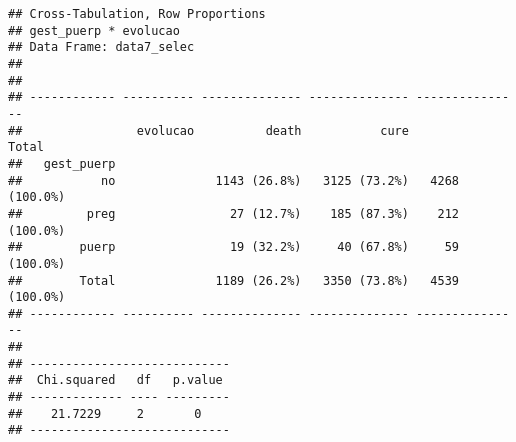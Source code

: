 \documentclass[
]{article}
\newenvironment{Shaded}{\begin{snugshade}}{\end{snugshade}}
\newcommand{\DataTypeTok}[1]{\textcolor[rgb]{0.13,0.29,0.53}{#1}}
\newcommand{\KeywordTok}[1]{\textcolor[rgb]{0.13,0.29,0.53}{\textbf{#1}}}
\newcommand{\NormalTok}[1]{#1}
\newcommand{\OperatorTok}[1]{\textcolor[rgb]{0.81,0.36,0.00}{\textbf{#1}}}
\newcommand{\OtherTok}[1]{\textcolor[rgb]{0.56,0.35,0.01}{#1}}
\newcommand{\StringTok}[1]{\textcolor[rgb]{0.31,0.60,0.02}{#1}}
\begin{document}
\begin{Shaded}
\end{Shaded}

\begin{Shaded}
\end{Shaded}

\begin{verbatim}
## Cross-Tabulation, Row Proportions  
## gest_puerp * evolucao  
## Data Frame: data7_selec  
## 
## 
## ------------ ---------- -------------- -------------- ---------------
##                evolucao          death           cure           Total
##   gest_puerp                                                         
##           no              1143 (26.8%)   3125 (73.2%)   4268 (100.0%)
##         preg                27 (12.7%)    185 (87.3%)    212 (100.0%)
##        puerp                19 (32.2%)     40 (67.8%)     59 (100.0%)
##        Total              1189 (26.2%)   3350 (73.8%)   4539 (100.0%)
## ------------ ---------- -------------- -------------- ---------------
## 
## ----------------------------
##  Chi.squared   df   p.value 
## ------------- ---- ---------
##    21.7229     2       0    
## ----------------------------
\end{verbatim}

\begin{Shaded}
\end{Shaded}
\end{document}
